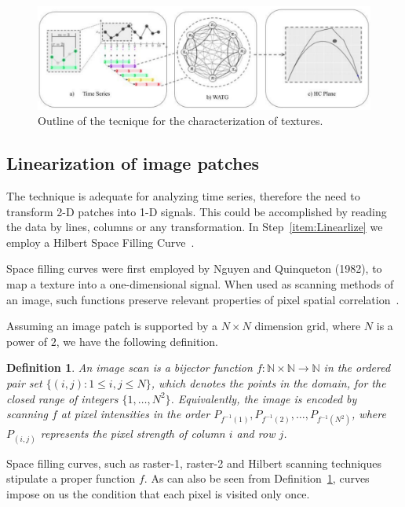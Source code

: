 \documentclass{isprs}
\begin{document}
\begin{figure}[hbt]
	\centering
	\includegraphics[scale = 0.25]{Figures/WATG.pdf}
	\caption{Outline of the tecnique for the characterization of textures.}
	\label{fig:WATG}
\end{figure}

\subsection{Linearization of image patches}\label{linearization}

The technique is adequate for analyzing time series, therefore the need to transform 2-D patches into 1-D signals.
This could be accomplished by reading the data by lines, columns or any transformation.
In Step~\ref{item:Linearlize} we employ a Hilbert Space Filling Curve~\citep{Lee1994Texture}.

Space filling curves were first employed by Nguyen and Quinqueton (1982), to map a texture into a one-dimensional signal.
When used as scanning methods of an image, such functions preserve relevant properties of pixel spatial correlation~\citep{Lee1994Texture}.

Assuming an image patch is supported by a $N \times N$ dimension grid, where $N$ is a power of $2$, we have the following definition.

\newtheorem{mydef}{Definition}
\begin{mydef}
	An image scan is a bijector function $f \colon \mathbb{N} \times \mathbb{N} \to \mathbb{N}$ in the ordered pair set $ \{(i, j): 1 \leq i , j \leq N \}$, which denotes the points in the domain, for the closed range of integers $\{1, \dots, N^2\}$. Equivalently, the image is encoded by scanning $f$ at pixel intensities in the order $P_{f^{-1}(1)}, P_{f^{-1}(2)}, \dots, P_{f^{-1}(N^2)}$, where $P_{(i, j)}$ represents the pixel strength of column $i$ and row $j$.
	\label{def:CurveFilling}
\end{mydef}

Space filling curves, such as raster-1, raster-2 and Hilbert scanning techniques stipulate a proper function $f$.
As can also be seen from Definition~\ref{def:CurveFilling}, curves impose on us the condition that each pixel is visited only once.
\end{document}
